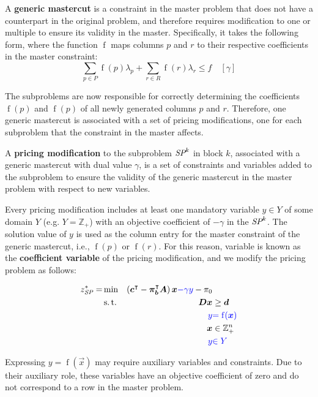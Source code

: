 \begin{definition}\label{def:gm}
A \textbf{generic mastercut} is a constraint in the master problem that does not have a counterpart in the original problem, and therefore requires modification to one or multiple \SP{} to ensure its validity in the master. Specifically, it takes the following form, where the function $\operatorname{f}$ maps columns $p$ and $r$ to their respective coefficients in the master constraint:
\begin{equation*}
\sum_{p \in P} \operatorname{f}(p) \lambda_p + \sum_{r \in R} \operatorname{f}(r) \lambda_r \leq f \quad \left[\gamma\right]
\end{equation*}

The subproblems are now responsible for correctly determining the coefficients $\operatorname{f}(p)$ and $\operatorname{f}(p)$ of all newly generated columns $p$ and $r$. Therefore, one generic mastercut is associated with a set of pricing modifications, one for each subproblem that the constraint in the master affects.
\end{definition}

\begin{definition}\label{def:gm_pricing_modification}
A \textbf{pricing modification} to the subproblem $\SP{k}$ in block $k$, associated with a generic mastercut with dual value $\gamma$, is a set of constraints and variables added to the subproblem to ensure the validity of the generic mastercut in the master problem with respect to new variables.

Every pricing modification includes at least one mandatory variable $y \in Y$ of some domain $Y$ (e.g. $Y = \mathbb{Z}_+$) with an objective coefficient of $-\gamma$ in the $\SP{k}$. The solution value of $y$ is used as the column entry for the master constraint of the generic mastercut, i.e., $\operatorname{f}(p)$ or $\operatorname{f}(r)$. For this reason, variable is known as the \textbf{coefficient variable} of the pricing modification, and we modify the pricing problem as follows:

\begin{equation*}
\begin{aligned}
z^*_\SP{} = &\min & \left( \vec{c}\transpose - \vec{\pi}_\vec{b}\transpose \mat{A} \right) \vec{x} {\color{blue} - \gamma y} - \pi_0 & \\
&\st & \mat{D} \vec{x} & \geq \vec{d} \\
&& {\color{blue} y} & {\color{blue} = \operatorname{f}(\vec{x})} \\
&& \vec{x} & \in \mathbb{Z}_+^n \\
&& {\color{blue} y} & {\color{blue} \in Y}
\end{aligned}
\end{equation*}

Expressing $y = \operatorname{f}(\vec{x})$ may require auxiliary variables and constraints. Due to their auxiliary role, these variables have an objective coefficient of zero and do not correspond to a row in the master problem.
\end{definition}

